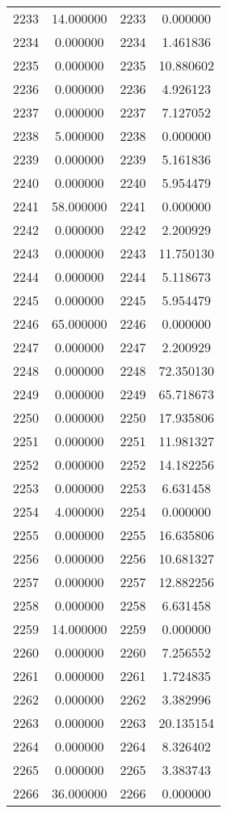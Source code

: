 \documentclass[12pt]{article}
\begin{document}
\begin{longtable}{@{}cccc@{}}
2233 & 14.000000 & 2233 & 0.000000 \\
2234 & 0.000000 & 2234 & 1.461836 \\
2235 & 0.000000 & 2235 & 10.880602 \\
2236 & 0.000000 & 2236 & 4.926123 \\
2237 & 0.000000 & 2237 & 7.127052 \\
2238 & 5.000000 & 2238 & 0.000000 \\
2239 & 0.000000 & 2239 & 5.161836 \\
2240 & 0.000000 & 2240 & 5.954479 \\
2241 & 58.000000 & 2241 & 0.000000 \\
2242 & 0.000000 & 2242 & 2.200929 \\
2243 & 0.000000 & 2243 & 11.750130 \\
2244 & 0.000000 & 2244 & 5.118673 \\
2245 & 0.000000 & 2245 & 5.954479 \\
2246 & 65.000000 & 2246 & 0.000000 \\
2247 & 0.000000 & 2247 & 2.200929 \\
2248 & 0.000000 & 2248 & 72.350130 \\
2249 & 0.000000 & 2249 & 65.718673 \\
2250 & 0.000000 & 2250 & 17.935806 \\
2251 & 0.000000 & 2251 & 11.981327 \\
2252 & 0.000000 & 2252 & 14.182256 \\
2253 & 0.000000 & 2253 & 6.631458 \\
2254 & 4.000000 & 2254 & 0.000000 \\
2255 & 0.000000 & 2255 & 16.635806 \\
2256 & 0.000000 & 2256 & 10.681327 \\
2257 & 0.000000 & 2257 & 12.882256 \\
2258 & 0.000000 & 2258 & 6.631458 \\
2259 & 14.000000 & 2259 & 0.000000 \\
2260 & 0.000000 & 2260 & 7.256552 \\
2261 & 0.000000 & 2261 & 1.724835 \\
2262 & 0.000000 & 2262 & 3.382996 \\
2263 & 0.000000 & 2263 & 20.135154 \\
2264 & 0.000000 & 2264 & 8.326402 \\
2265 & 0.000000 & 2265 & 3.383743 \\
2266 & 36.000000 & 2266 & 0.000000 \\

\end{longtable}
\end{document}
